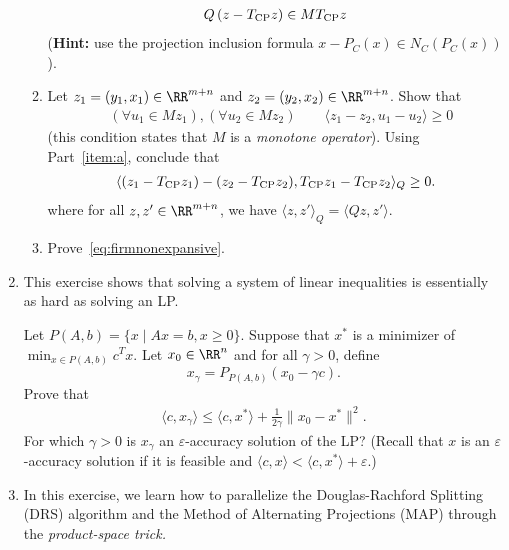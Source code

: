 \documentclass[11pt]{article}
\begin{document}
\begin{enumerate}
\begin{enumerate}
\begin{align*}
Q \left(z - T_{\mathrm{CP}} z\right) \in M T_{\mathrm{CP}} z
\end{align*}
(\textbf{Hint:} use the projection inclusion formula $x - P_C(x) \in N_{C}(P_C(x))$).
\item Let $z_1 =  (y_1,x_1) \in \RR^{m + n}$ and $z_2 = (y_2, x_2) \in \RR^{m+n}$. Show that 
\begin{align*}
&\left(\forall u_1 \in Mz_1\right), \left(\forall u_2 \in M z_2 \right) \qquad \langle z_1 - z_2, u_1 - u_2\rangle \geq 0
\end{align*}
(this condition states that $M$ is a \textit{monotone operator}). Using Part~\ref{item:a}, conclude that 
\begin{align*}
\langle  (z_1 - T_{\mathrm{CP}} z_1) - (z_2 - T_{\mathrm{CP}} z_2), T_{\mathrm{CP}} z_1 - T_{\mathrm{CP}} z_2\rangle_Q \geq 0.
\end{align*}
where for all $z, z' \in \RR^{m+n}$, we have $\langle z, z' \rangle_Q  = \langle Qz, z'\rangle$.
\item Prove~\eqref{eq:firmnonexpansive}.
\end{enumerate}

\item This exercise shows that solving a system of linear inequalities is essentially as hard as solving an LP.

Let $P(A, b) = \{x \mid Ax = b, x \geq 0\}$. Suppose that $x^\ast$ is a minimizer of $\min_{x \in P(A, b)} c^T x$. Let $x_0 \in \RR^n$ and for all $\gamma > 0$, define 
$$
x_\gamma = P_{P(A, b)} (x_0 - \gamma c).
$$
Prove that 
\begin{align*}
\langle c, x_\gamma\rangle \leq \langle c, x^\ast\rangle  + \frac{1}{2\gamma}\|x_0 - x^\ast\|^2.
\end{align*}
For which $\gamma > 0$ is $x_\gamma$ an $\varepsilon$-accuracy solution of the LP? (Recall that $x$ is an $\varepsilon$-accuracy solution if it is feasible and $\langle c, x\rangle < \langle c, x^\ast \rangle + \varepsilon.$) 

\item In this exercise, we learn how to parallelize the Douglas-Rachford Splitting (DRS) algorithm and the Method of Alternating Projections (MAP) through the \textit{product-space trick.}


\end{enumerate}
\end{document}
